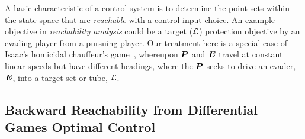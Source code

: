 \noindent A basic characteristic of a control system is to determine the  point sets within the state space that are \textit{reachable} with a control input choice. An example objective in \textit{reachability analysis} could be a target ($\mathcal{L}$) protection objective by an evading player from a pursuing player. Our treatment here is a special case of Isaac's homicidal chauffeur's game~\cite{Isaacs1965}, whereupon $\bm{P}$ and $\bm{E}$ travel at constant linear speeds but have different headings, \eg where the $\bm{P}$ seeks to drive an evader, $\bm{E}$, into a target  set or tube, $\mathcal{L}$. %


\subsection{Backward Reachability from Differential Games Optimal Control}

